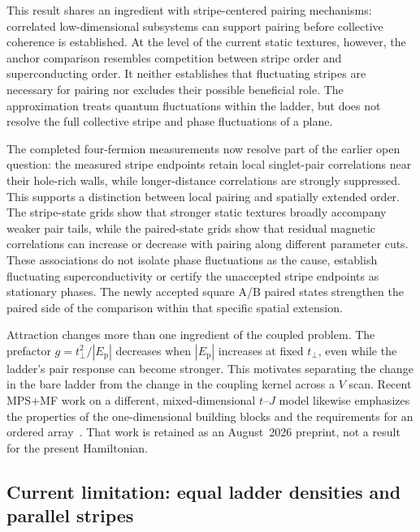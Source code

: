 \documentclass[11pt,letterpaper]{article}
\newcommand{\tp}{t_{\perp}}
\newcommand{\Ep}{E_{\mathrm p}}
\begin{document}
This result shares an ingredient with stripe-centered pairing mechanisms:
correlated low-dimensional subsystems can support pairing before collective
coherence is established. At the level of the current static textures,
however, the anchor comparison resembles competition between stripe order
and superconducting order. It neither establishes that fluctuating stripes
are necessary for pairing nor excludes their possible beneficial role.
The approximation treats quantum fluctuations within the ladder, but does
not resolve the full collective stripe and phase fluctuations of a plane.

The completed four-fermion measurements now resolve part of the earlier
open question: the measured stripe endpoints retain local singlet-pair
correlations near their hole-rich walls, while longer-distance correlations
are strongly suppressed. This supports a distinction between local pairing
and spatially extended order. The stripe-state grids show that stronger
static textures broadly accompany weaker pair tails, while the paired-state
grids show that residual magnetic correlations can increase or decrease
with pairing along different parameter cuts. These associations do not
isolate phase fluctuations as the cause, establish
fluctuating superconductivity or certify the unaccepted stripe endpoints as
stationary phases. The newly accepted square A/B paired states strengthen
the paired side of the comparison within that specific spatial extension.

Attraction changes more than one ingredient of the coupled problem.
The prefactor $g=\tp^2/|\Ep|$ decreases when $|\Ep|$ increases at fixed
$\tp$, even while the ladder's pair response can become stronger.
This motivates separating the change in the bare ladder from the change
in the coupling kernel across a $V$ scan. Recent MPS+MF work on a different,
mixed-dimensional $t$--$J$ model likewise emphasizes the properties of the
one-dimensional building blocks and the requirements for an ordered
array~\citep{Kohler2026}. That work is retained as an August~2026 preprint,
not a result for the present Hamiltonian.

\subsection{Current limitation: equal ladder densities and parallel stripes}
\label{sec:parallel-stripe-limit}
\end{document}
